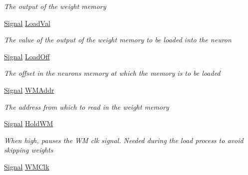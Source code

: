 \begin{DoxyCompactItemize}
\begin{DoxyCompactList}\small\item\em The output of the weight memory \end{DoxyCompactList}\item 
\hyperlink{class_n_n_gen_1_1_signal}{Signal} \hyperlink{class_n_n_gen_1_1_sync_neural_network_a69b1e243c9d77ba27a38e3859147f588}{Load\+Val}
\begin{DoxyCompactList}\small\item\em The value of the output of the weight memory to be loaded into the neuron \end{DoxyCompactList}\item 
\hyperlink{class_n_n_gen_1_1_signal}{Signal} \hyperlink{class_n_n_gen_1_1_sync_neural_network_af587100e0516b187c280dc23b2c226e0}{Load\+Off}
\begin{DoxyCompactList}\small\item\em The offset in the neuron\textquotesingle{}s memory at which the memory is to be loaded \end{DoxyCompactList}\item 
\hyperlink{class_n_n_gen_1_1_signal}{Signal} \hyperlink{class_n_n_gen_1_1_sync_neural_network_a26d6d7d846eadc650f466ec37b69c2cb}{W\+M\+Addr}
\begin{DoxyCompactList}\small\item\em The address from which to read in the weight memory \end{DoxyCompactList}\item 
\hyperlink{class_n_n_gen_1_1_signal}{Signal} \hyperlink{class_n_n_gen_1_1_sync_neural_network_adde5cc8cf981b7e6dd24ddcb0193cd9a}{Hold\+W\+M}
\begin{DoxyCompactList}\small\item\em When high, pauses the W\+M clk signal. Needed during the load process to avoid skipping weights \end{DoxyCompactList}\item 
\hyperlink{class_n_n_gen_1_1_signal}{Signal} \hyperlink{class_n_n_gen_1_1_sync_neural_network_ad0473c03570ed0231da8b2d62487b99a}{W\+M\+Clk}

\end{DoxyCompactItemize}
